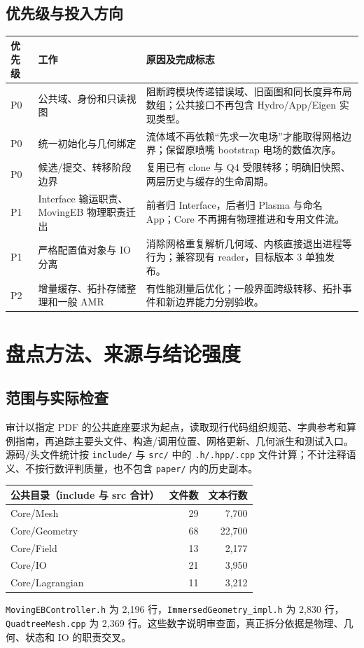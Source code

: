 \documentclass[UTF8,a4paper,11pt,fontset=fandol]{ctexart}
\newcommand{\code}[1]{\nolinkurl{#1}}
\begin{document}
\subsection{优先级与投入方向}
\begin{longtable}{@{}P{.11\textwidth}P{.31\textwidth}P{.52\textwidth}@{}}
\toprule 优先级 & 工作 & 原因及完成标志\\\midrule\endhead
P0 & 公共域、身份和只读视图 & 阻断跨模块传递错误域、旧面图和同长度异布局数组；公共接口不再包含 Hydro/App/Eigen 实现类型。\\
P0 & 统一初始化与几何绑定 & 流体域不再依赖“先求一次电场”才能取得网格边界；保留原喷嘴 bootstrap 电场的数值次序。\\
P0 & 候选/提交、转移阶段边界 & 复用已有 clone 与 Q4 受限转移；明确旧快照、两层历史与缓存的生命周期。\\
P1 & Interface 输运职责、MovingEB 物理职责迁出 & 前者归 Interface，后者归 Plasma 与命名 App；Core 不再拥有物理推进和专用文件流。\\
P1 & 严格配置值对象与 IO 分离 & 消除网格重复解析几何域、内核直接退出进程等行为；兼容现有 reader，目标版本 3 单独发布。\\
P2 & 增量缓存、拓扑存储整理和一般 AMR & 有性能测量后优化；一般界面跨级转移、拓扑事件和新边界能力分别验收。\\
\bottomrule
\end{longtable}

\section{盘点方法、来源与结论强度}
\subsection{范围与实际检查}
审计以指定 PDF 的公共底座要求为起点，读取现行代码组织规范、字典参考和算例指南，再追踪主要头文件、构造/调用位置、网格更新、几何派生和测试入口。源码/头文件统计按 \code{include/} 与 \code{src/} 中的 \code{.h/.hpp/.cpp} 文件计算；不计注释语义、不按行数评判质量，也不包含 \code{paper/} 内的历史副本。
\begin{center}
\begin{tabular}{@{}lrr@{}}
\toprule 公共目录（include 与 src 合计） & 文件数 & 文本行数\\\midrule
Core/Mesh & 29 & 7,700\\
Core/Geometry & 68 & 22,700\\
Core/Field & 13 & 2,177\\
Core/IO & 21 & 3,950\\
Core/Lagrangian & 11 & 3,212\\
\bottomrule
\end{tabular}
\end{center}
\code{MovingEBController.h} 为 2,196 行，\code{ImmersedGeometry_impl.h} 为 2,830 行，\code{QuadtreeMesh.cpp} 为 2,369 行。这些数字说明审查面，真正拆分依据是物理、几何、状态和 IO 的职责交叉。
\end{document}
